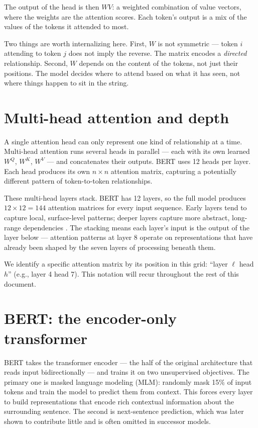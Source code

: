 The output of the head is then $W V$: a weighted combination of value vectors, where the weights are the attention scores. Each token's output is a mix of the values of the tokens it attended to most.

Two things are worth internalizing here. First, $W$ is not symmetric --- token $i$ attending to token $j$ does not imply the reverse. The matrix encodes a \emph{directed} relationship. Second, $W$ depends on the content of the tokens, not just their positions. The model decides where to attend based on what it has seen, not where things happen to sit in the string.

\section{Multi-head attention and depth}

A single attention head can only represent one kind of relationship at a time. Multi-head attention runs several heads in parallel --- each with its own learned $W^Q$, $W^K$, $W^V$ --- and concatenates their outputs. BERT uses 12 heads per layer. Each head produces its own $n \times n$ attention matrix, capturing a potentially different pattern of token-to-token relationships.

These multi-head layers stack. BERT has 12 layers, so the full model produces $12 \times 12 = 144$ attention matrices for every input sequence. Early layers tend to capture local, surface-level patterns; deeper layers capture more abstract, long-range dependencies \parencite{clark2019}. The stacking means each layer's input is the output of the layer below --- attention patterns at layer 8 operate on representations that have already been shaped by the seven layers of processing beneath them.

We identify a specific attention matrix by its position in this grid: ``layer $\ell$ head $h$'' (e.g., layer 4 head 7). This notation will recur throughout the rest of this document.

\section{BERT: the encoder-only transformer}

BERT \parencite{devlin2019} takes the transformer encoder --- the half of the original architecture that reads input bidirectionally --- and trains it on two unsupervised objectives. The primary one is masked language modeling (MLM): randomly mask 15\% of input tokens and train the model to predict them from context. This forces every layer to build representations that encode rich contextual information about the surrounding sentence. The second is next-sentence prediction, which was later shown to contribute little and is often omitted in successor models.

